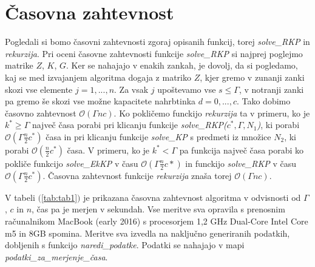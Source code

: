 \documentclass[a4paper,12pt]{article}
\theoremstyle{definition}
\begin{document}
\section{Časovna zahtevnost}
\medskip
Pogledali si bomo časovni zahtevnosti zgoraj opisanih funkcij, torej \textit{solve\_RKP}
in \textit{rekurzija}. 
Pri oceni časovne zahtevnosti funkcije \textit{solve\_RKP} 
si najprej poglejmo matrike $Z$, $K$, $G$. Ker se nahajajo v enakih 
zankah, je dovolj, da si pogledamo, kaj se med izvajanjem algoritma
dogaja z matriko $Z$, kjer gremo v zunanji zanki skozi vse elemente $j = 1, ...,n$.
Za vsak $j$ upoštevamo vse $s \leq \Gamma$, v notranji zanki pa gremo še
skozi vse možne kapacitete nahrbtinka $d = 0, ..., c$. Tako dobimo časovno zahtevnost
$\mathcal{O}(\Gamma n c)$.
Ko pokličemo funckijo \textit{rekurzija} ta v primeru,
ko je $k^* \geq \Gamma$ največ 
časa porabi pri klicanju funkcije \textit{solve\_RKP($c^*, \Gamma, N_1$)},
ki porabi $\mathcal{O}(\Gamma \frac{n}{2} c^*)$ časa in pri klicanju funkcije \textit{solve\_KP} s predmeti iz množice 
$N_2$, ki porabi $\mathcal{O}(\frac{n}{2} c^*)$ časa. V primeru,
 ko je $k^* < \Gamma$ pa funkcija največ časa porabi ko pokliče funkcijo \textit{solve\_EkKP} v času $\mathcal{O}(\Gamma \frac{n}{2} c*)$
 in funckijo \textit{solve\_RKP} v času $\mathcal{O}(\Gamma \frac{n}{2} c^*)$. Časovna zahtevnost funkcije \textit{rekurzija}
 znaša torej $\mathcal{O}(\Gamma n c)$.
 \par
 V tabeli $($\ref{tab:tab1}$)$ je prikazana časovna zahtevnost algoritma v odvisnosti od $\Gamma$, $c$ in $n$, čas pa je merjen v sekundah.
 Vse meritve sva opravila s prenosnim računalnikom MacBook (early 2016) s procesorjem 1,2 GHz Dual-Core Intel Core m5 in 8GB spomina.
  Meritve sva izvedla na naključno generiranih podatkih, dobljenih s funkcijo \textit{naredi\_podatke}.
 Podatki se nahajajo v mapi \textit{podatki\_za\_merjenje\_časa}.
 
     
 
\end{document}
